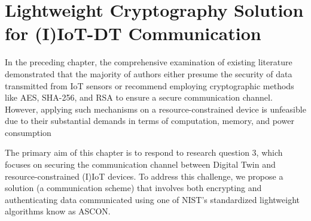 


\chapter{Lightweight Cryptography Solution for (I)IoT-DT Communication}
\label{Chapter3} %



In the preceding chapter, the comprehensive examination of existing literature demonstrated that the majority of authors either presume the security of data transmitted from IoT sensors or recommend employing cryptographic methods like AES, SHA-256, and RSA to ensure a secure communication channel. However, applying such mechanisms on a resource-constrained device is unfeasible due to their substantial demands in terms of computation, memory, and power consumption \cite{vanderwalSecuringNetworksIoT2022a}





The primary aim of this chapter is to respond to research question 3, which focuses on securing the communication channel between Digital Twin and resource-constrained (I)IoT devices. To address this challenge, we propose a solution (a communication scheme) that involves both encrypting and authenticating data communicated using one of NIST's standardized lightweight algorithms know as ASCON.  

